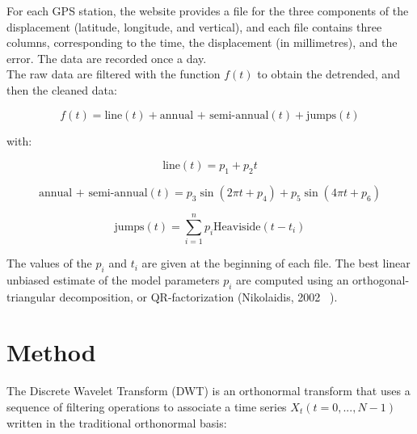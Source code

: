 \documentclass[main.tex]{subfiles}
\begin{document}
For each GPS station, the website provides a file for the three components of the displacement (latitude, longitude, and vertical), and each file contains three columns, corresponding to the time, the displacement (in millimetres), and the error. The data are recorded once a day. \\

The raw data are filtered with the function $f (t)$ to obtain the detrended, and then the cleaned data:

\begin{equation}
f (t) = \textrm{line} (t) + \textrm{annual + semi-annual} (t) + \textrm{jumps} (t)
\end{equation}

with:

\begin{equation}
\textrm{line} (t) = p_1 + p_2 t
\end{equation}

\begin{equation}
\textrm{annual + semi-annual} (t) = p_3 \sin (2 \pi t + p_4) + p_5 \sin (4 \pi t + p_6)
\end{equation}

\begin{equation}
\textrm{jumps} (t) = \sum_{i = 1}^{n} p_i \textrm{Heaviside} (t - t_i)
\end{equation}

The values of the $p_i$ and $t_i$ are given at the beginning of each file. The best linear unbiased estimate of the model parameters $p_i$ are computed using an orthogonal-triangular decomposition, or QR-factorization (Nikolaidis, 2002 ~\cite{NIK_2002}).

\chapter{Method}

The Discrete Wavelet Transform (DWT) is an orthonormal transform that uses a sequence of filtering operations to associate a time series $X_t (t = 0 , ... , N - 1)$ written in the traditional orthonormal basis:
\end{document}
